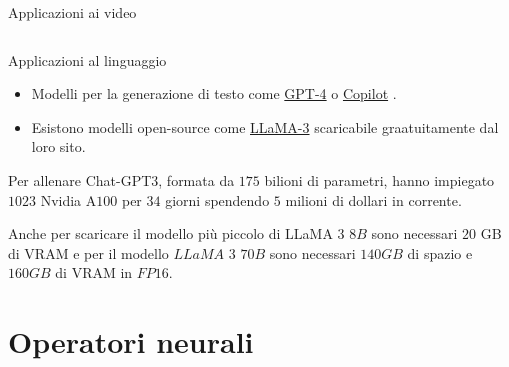 \documentclass[aspectratio=169]{beamer}
\begin{document}
\begin{frame}{Applicazioni ai video}
\begin{columns}[T]
\begin{column}{.33\textwidth}
\begin{center}
            \end{center}
        \end{column}
    \end{columns}
\end{frame}

\begin{frame}{Applicazioni al linguaggio}
    \begin{itemize}
    \item Modelli per la generazione di testo come \href{https://openai.com/index/gpt-4/}{GPT-4}  o \href{https://github.com/features/copilot}{Copilot} .
    \item Esistono modelli open-source come \href{https://llama.meta.com/}{LLaMA-3}  scaricabile graatuitamente dal loro sito. 
    \end{itemize}
    \pause
    Per allenare Chat-GPT3, formata da $175$ bilioni di parametri, hanno impiegato $1023$ Nvidia A$100$ per $34$ giorni spendendo $5$ milioni di dollari in corrente.
    
    \pause
    Anche per scaricare il modello più piccolo di LLaMA $3$ $8B$ sono necessari $20$ GB di VRAM e per il modello $LLaMA$ $3$ $70B$ sono necessari $140GB$ di spazio e $160GB$ di VRAM in $FP16$.
\end{frame}

\section{Operatori neurali}
\sectionpage
\end{document}
